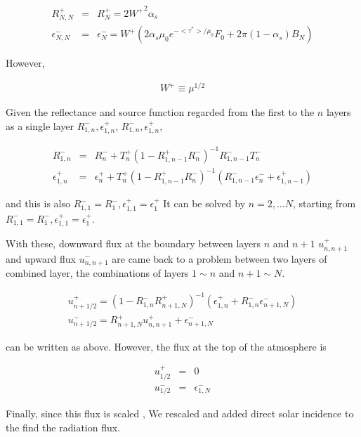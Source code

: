 \begin{eqnarray}
  R^+_{N,N} & = &  R^+_N = 2 {W^+}^2 \alpha_s \\
  \epsilon^-_{N,N} & = &  \epsilon^-_N 
    = W^+ \left( 2 \alpha_s \mu_0 e^{-<\tau^*>/\mu_0} F_0 
                 + 2 \pi (1-\alpha_s) B_N 
          \right)
\end{eqnarray}

However,

\begin{eqnarray}
  W^+ \equiv \mu^{1/2}
\end{eqnarray}

Given the reflectance and source function regarded from the first to the \(n\) layers as a single layer \(R^-_{1,n}, \epsilon^+_{1,n}\), \(R^-_{1,n}, \epsilon^+_{1,n}\),

\begin{eqnarray}
  R^-_{1,n} & = & R^-_n 
      + T^+_n ( 1- R^+_{1,n-1} R^-_n )^{-1} R^-_{1,n-1} T^-_n \\
  \epsilon^+_{1,n} & = & \epsilon^+_n
    + T^+_n ( 1- R^+_{1,n-1} R^-_n )^{-1} 
      ( R^-_{1,n-1} \epsilon^-_n + \epsilon^+_{1,n-1} ) 
\end{eqnarray}

and this is also \(R^-_{1,1} = R^-_1, \epsilon^+_{1,1} = \epsilon^+_1\)
It can be solved by \(n=2, \ldots N\), starting from \(R^-_{1,1} = R^-_1, \epsilon^+_{1,1} = \epsilon^+_1\).

With these, downward flux at the boundary between layers \(n\) and
\(n+1\) \(u^+_{n,n+1}\) and upward flux \(u^-_{n,n+1}\) are came back to a problem between
two layers of combined layer, the combinations of layers \(1\sim n\) and \(n+1\sim N\).  
 

\begin{eqnarray}
 u^+_{n+1/2} = (1-R^-_{1,n} R^+_{n+1,N})^{-1}
    (\epsilon^+_{1,n} + R^-_{1,n} \epsilon^-_{n+1,N} ) \\
 u^-_{n+1/2} = R^+_{n+1,N}  u^+_{n,n+1} + \epsilon^-_{n+1,N}
\end{eqnarray}

can be written as above. However, the flux at the top of the atmosphere is

\begin{eqnarray}
 u^+_{1/2} & = & 0 \\
 u^-_{1/2} & = & \epsilon^-_{1,N}
\end{eqnarray}

Finally, since this flux is scaled , We rescaled and added direct solar
incidence to the find the radiation flux.


